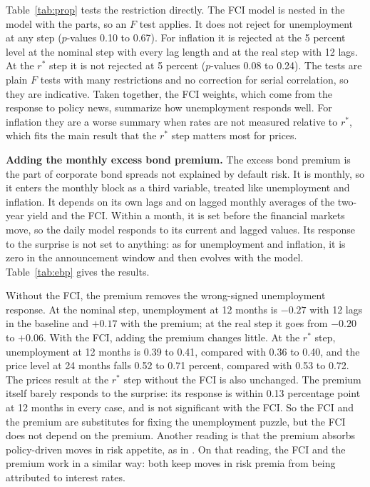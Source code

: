 \documentclass[11pt]{article}
\newcommand{\rs}{r^{*}}
\begin{document}
Table~\ref{tab:prop} tests the restriction directly. The FCI model is nested in the model with the parts, so an $F$ test applies. It does not reject for unemployment at any step ($p$-values 0.10 to 0.67). For inflation it is rejected at the 5 percent level at the nominal step with every lag length and at the real step with 12 lags. At the $\rs$ step it is not rejected at 5 percent ($p$-values 0.08 to 0.24). The tests are plain $F$ tests with many restrictions and no correction for serial correlation, so they are indicative. Taken together, the FCI weights, which come from the response to policy news, summarize how unemployment responds well. For inflation they are a worse summary when rates are not measured relative to $\rs$, which fits the main result that the $\rs$ step matters most for prices.

\textbf{Adding the monthly excess bond premium.} The excess bond premium \citep{gilchrist2012} is the part of corporate bond spreads not explained by default risk. It is monthly, so it enters the monthly block as a third variable, treated like unemployment and inflation. It depends on its own lags and on lagged monthly averages of the two-year yield and the FCI. Within a month, it is set before the financial markets move, so the daily model responds to its current and lagged values. Its response to the surprise is not set to anything: as for unemployment and inflation, it is zero in the announcement window and then evolves with the model. Table~\ref{tab:ebp} gives the results.

Without the FCI, the premium removes the wrong-signed unemployment response. At the nominal step, unemployment at 12 months is $-0.27$ with 12 lags in the baseline and $+0.17$ with the premium; at the real step it goes from $-0.20$ to $+0.06$. With the FCI, adding the premium changes little. At the $\rs$ step, unemployment at 12 months is 0.39 to 0.41, compared with 0.36 to 0.40, and the price level at 24 months falls 0.52 to 0.71 percent, compared with 0.53 to 0.72. The prices result at the $\rs$ step without the FCI is also unchanged. The premium itself barely responds to the surprise: its response is within 0.13 percentage point at 12 months in every case, and is not significant with the FCI. So the FCI and the premium are substitutes for fixing the unemployment puzzle, but the FCI does not depend on the premium. Another reading is that the premium absorbs policy-driven moves in risk appetite, as in \citet{bauer2026}. On that reading, the FCI and the premium work in a similar way: both keep moves in risk premia from being attributed to interest rates.
\end{document}
